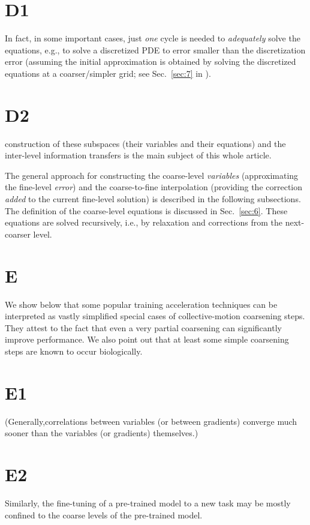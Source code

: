 \documentclass{article} %
\begin{document}
\section{D1}
In fact, in some important cases, just {\it one} cycle is needed to {\it adequately} solve the equations, e.g., to solve a discretized PDE to error smaller than the discretization error (assuming the initial approximation is obtained by solving the discretized equations at a coarser/simpler grid; see Sec.~\ref{sec:7} in \cite{4}).

\section{D2}
construction of these subspaces (their variables and their equations) and the inter-level information transfers is the main subject of this whole article.

The general approach for constructing the coarse-level {\it variables} (approximating the fine-level {\it error}) and the coarse-to-fine interpolation (providing the correction {\it added} to the current fine-level solution) is described in the following subsections. The definition of the coarse-level equations is discussed in Sec.~\ref{sec:6}. These equations are solved recursively, i.e., by relaxation and corrections from the next-coarser level.

\section{E}
We show below that some popular training acceleration techniques can be interpreted as vastly simplified special cases of collective-motion coarsening steps. They attest to the fact that even a very partial coarsening can significantly improve performance. We also point out that at least some simple coarsening steps are known to occur biologically.

\section{E1}
(Generally,correlations between variables (or between gradients) converge much sooner than the variables (or gradients) themselves.)

\section{E2}
Similarly, the fine-tuning of a pre-trained model to a new task may be mostly confined to the coarse levels of the pre-trained model.
\end{document}
